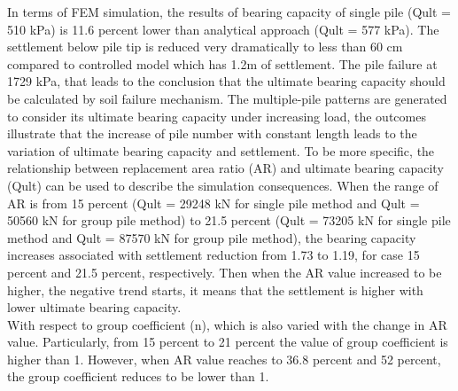 In terms of FEM simulation, the results of bearing capacity of single pile (Qult = 510
kPa) is 11.6 percent lower than analytical approach (Qult = 577 kPa). The settlement below
pile tip is reduced very dramatically to less than 60 cm compared to controlled model
which has 1.2m of settlement. The pile failure at 1729 kPa, that leads to the conclusion
that the ultimate bearing capacity should be calculated by soil failure mechanism. The
multiple-pile patterns are generated to consider its ultimate bearing capacity under
increasing load, the outcomes illustrate that the increase of pile number with constant
length leads to the variation of ultimate bearing capacity and settlement. To be more
specific, the relationship between replacement area ratio (AR) and ultimate bearing
capacity (Qult) can be used to describe the simulation consequences. When the range of
AR is from 15 percent (Qult = 29248 kN for single pile method and Qult = 50560 kN for group
pile method) to 21.5 percent (Qult = 73205 kN for single pile method and Qult = 87570 kN for
group pile method), the bearing capacity increases associated with settlement reduction
from 1.73 to 1.19, for case 15 percent and 21.5 percent, respectively. Then when the AR value increased to be higher, the negative trend starts, it means that the settlement is higher
with lower ultimate bearing capacity. \\ [10pt]

With respect to group coefficient (n), which is also varied with the change in AR value.
Particularly, from 15 percent to 21 percent the value of group coefficient is higher than 1. However, when AR value reaches to 36.8 percent and 52 percent, the group coefficient reduces to be lower than 1.